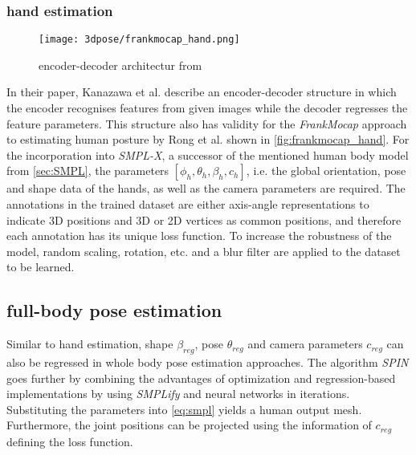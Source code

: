\subsubsection{hand estimation}
\begin{figure}[h]
	\centering
	\texttt{[image: 3dpose/frankmocap\_hand.png]}
	\caption{encoder-decoder architectur from \cite{frankmocap}}
	\label{fig:frankmocap_hand}
\end{figure}

In their paper, Kanazawa et al. \cite{hmr} describe an encoder-decoder structure in which the encoder recognises features from given images while the decoder regresses the feature parameters. This structure also has validity for the \emph{FrankMocap} approach to estimating human posture by Rong et al. shown in \autoref{fig:frankmocap_hand}. For the incorporation into \emph{SMPL-X}, a successor of the mentioned human body model from \autoref{sec:SMPL}, the parameters $[\phi_{h},\theta_{h},\beta_{h},c_{h}]$, i.e. the global orientation, pose and shape data of the hands, as well as the camera parameters are required. The annotations in the trained dataset are either axis-angle representations to indicate 3D positions and 3D or 2D vertices as common positions, and therefore each annotation has its unique loss function. To increase the robustness of the model, random scaling, rotation, etc. and a blur filter are applied to the dataset to be learned.

\subsection{full-body pose estimation}
Similar to hand estimation, shape $\beta_{reg}$, pose $\theta_{reg}$ and camera parameters $c_{reg}$ can also be regressed in whole body pose estimation approaches. The algorithm \emph{SPIN} goes further by combining the advantages of optimization and regression-based implementations by using \emph{SMPLify} and neural networks in iterations. Substituting the parameters into \autoref{eq:smpl} yields a human output mesh. Furthermore, the joint positions can be projected using the information of $c_{reg}$ defining the loss function. \cite{SPIN}
